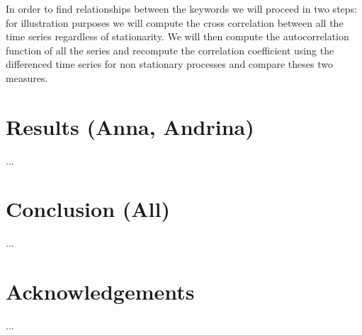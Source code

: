 \documentclass[12pt, a4paper]{article}
\begin{document}
In order to find relationships between the keywords we will proceed in two steps: for illustration purposes we will compute the cross correlation between all the time series regardless of stationarity. We will then compute the autocorrelation function of all the series and recompute the correlation coefficient using the differenced time series for non stationary processes and compare theses two measures.

\section{Results (Anna, Andrina)}
...


\section{Conclusion (All)}
...


\section{Acknowledgements}
...
\end{document}
